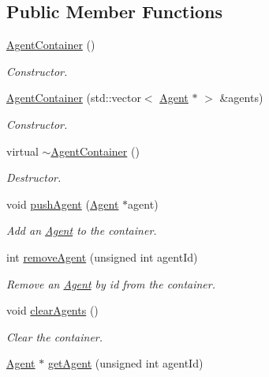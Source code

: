 \subsection*{Public Member Functions}
\begin{DoxyCompactItemize}
\item 
\hyperlink{classAgentContainer_ac7e6b1698c4270e58f6143af974b0317}{Agent\+Container} ()
\begin{DoxyCompactList}\small\item\em Constructor. \end{DoxyCompactList}\item 
\hyperlink{classAgentContainer_af38dc491d4e987a33fac7eebcbf2006b}{Agent\+Container} (std\+::vector$<$ \hyperlink{classAgent}{Agent} $\ast$ $>$ \&agents)
\begin{DoxyCompactList}\small\item\em Constructor. \end{DoxyCompactList}\item 
virtual \hyperlink{classAgentContainer_a968652639a4749f9a279fbcdf0c671e3}{$\sim$\+Agent\+Container} ()
\begin{DoxyCompactList}\small\item\em Destructor. \end{DoxyCompactList}\item 
void \hyperlink{classAgentContainer_a9fcac4f7f925326633b3d74f3923c5ff}{push\+Agent} (\hyperlink{classAgent}{Agent} $\ast$agent)
\begin{DoxyCompactList}\small\item\em Add an \hyperlink{classAgent}{Agent} to the container. \end{DoxyCompactList}\item 
int \hyperlink{classAgentContainer_a08536f977e775903573a3891a7d2f314}{remove\+Agent} (unsigned int agent\+Id)
\begin{DoxyCompactList}\small\item\em Remove an \hyperlink{classAgent}{Agent} by id from the container. \end{DoxyCompactList}\item 
void \hyperlink{classAgentContainer_a0c33290cf10b72894c245fcc298755b3}{clear\+Agents} ()
\begin{DoxyCompactList}\small\item\em Clear the container. \end{DoxyCompactList}\item 
\hyperlink{classAgent}{Agent} $\ast$ \hyperlink{classAgentContainer_a140e5a8416b3c0d4fe917641f3dc35de}{get\+Agent} (unsigned int agent\+Id)

\end{DoxyCompactItemize}
